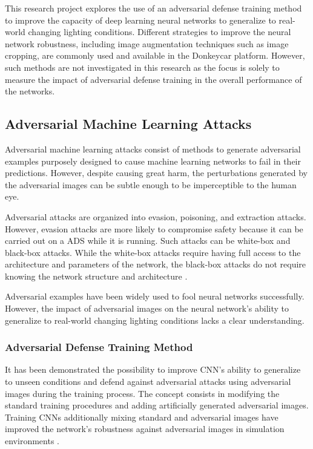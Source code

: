 \documentclass[12pt]{article}
\begin{document}
This research project explores the use of an adversarial defense training method to improve the capacity of deep learning neural networks to generalize to real-world changing lighting conditions. Different strategies to improve the neural network robustness, including image augmentation techniques such as image cropping, are commonly used and available in the Donkeycar platform. However, such methods are not investigated in this research as the focus is solely to measure the impact of adversarial defense training in the overall performance of the networks.

\subsection{Adversarial Machine Learning Attacks}

Adversarial machine learning attacks consist of methods to generate adversarial examples purposely designed to cause machine learning networks to fail in their predictions. However, despite causing great harm, the perturbations generated by the adversarial images can be subtle enough to be imperceptible to the human eye.

Adversarial attacks are organized into evasion, poisoning, and extraction attacks. However, evasion attacks are more likely to compromise safety because it can be carried out on a ADS while it is running. Such attacks can be white-box and black-box attacks. While the white-box attacks require having full access to the architecture and parameters of the network, the black-box attacks do not require knowing the network structure and architecture \parencite{piazzesi}. 
 
Adversarial examples have been widely used to fool neural networks successfully. However, the impact of adversarial images on the neural network's ability to generalize to real-world changing lighting conditions lacks a clear understanding.

\subsubsection{Adversarial Defense Training Method} 

It has been demonstrated the possibility to improve CNN's ability to generalize to unseen conditions and defend against adversarial attacks using adversarial images during the training process. The concept consists in modifying the standard training procedures and adding artificially generated adversarial images. Training CNNs additionally mixing standard and adversarial images have improved the network's robustness against adversarial images in simulation environments \parencite{Rosebrock}. 
\end{document}
